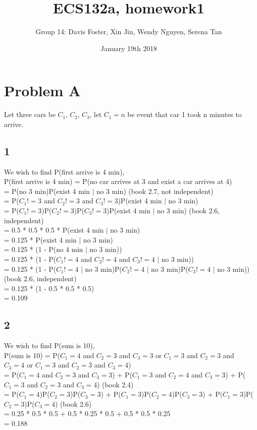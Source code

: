 \documentclass{article}
\title{ECS132a, homework1}
\author{Group 14: Davis Foster, Xin Jin, Wendy Nguyen, Serena Tan}
\date{January 19th 2018}
\begin{document}
\maketitle

\section{Problem A}
Let three cars be $C_{1}$, $C_{2}$, $C_{3}$, let $C_{1} = n$ be event that car 1 took n minutes to arrive.
\subsection{1}
We wish to find P(first arrive is 4 min),\\
P(first arrive is 4 min) = P(no car arrives at 3 and exist a car arrives at 4)\\
= P(no 3 min)P(exist 4 min $|$ no 3 min) (book 2.7, not independent)\\
= P($C_{1}!=3$ and $C_{2}!=3$ and $C_{3}!=3$)P(exist 4 min $|$ no 3 min)\\
= P($C_{1}!=3$)P($C_{2}!=3$)P($C_{3}!=3$)P(exist 4 min $|$ no 3 min) (book 2.6, independent)\\
= 0.5 * 0.5 * 0.5 * P(exist 4 min $|$ no 3 min)\\
= 0.125 * P(exist 4 min $|$ no 3 min)\\
= 0.125 * (1 - P(no 4 min $|$ no 3 min))\\
= 0.125 * (1 - P($C_{1}!=4$ and $C_{2}!=4$ and $C_{3}!=4$ $|$ no 3 min))\\
= 0.125 * (1 - P($C_{1}!=4$ $|$ no 3 min)P($C_{2}!=4$ $|$ no 3 min)P($C_{3}!=4$ $|$ no 3 min)) (book 2.6, independent)\\
= 0.125 * (1 - 0.5 * 0.5 * 0.5)\\
= 0.109\\

\subsection{2}
We wish to find P(sum is 10),\\
P(sum is 10) = P($C_{1}=4$ and $C_{2}=3$ and $C_{3}=3$ or $C_{1}=3$ and $C_{2}=3$ and $C_{3}=4$ or $C_{1}=3$ and $C_{2}=3$ and $C_{3}=4$)\\
= P($C_{1}=4$ and $C_{2}=3$ and $C_{3}=3$) + P($C_{1}=3$ and $C_{2}=4$ and $C_{3}=3$) + P($C_{1}=3$ and $C_{2}=3$ and $C_{3}=4$) (book 2.4)\\
= P($C_{1}=4$)P($C_{2}=3$)P($C_{3}=3$) + P($C_{1}=3$)P($C_{2}=4$)P($C_{3}=3$) + P($C_{1}=3$)P($C_{2}=3$)P($C_{3}=4$) (book 2.6)\\
= 0.25 * 0.5 * 0.5 + 0.5 * 0.25 * 0.5 + 0.5 * 0.5 * 0.25\\
= 0.188\\
\end{document}
